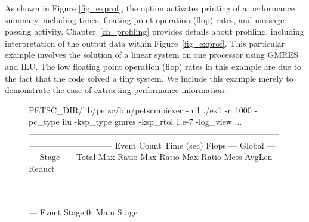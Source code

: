 As shown in Figure \ref{fig_exprof}, the option  activates printing of a performance summary, including
times, floating point operation (flop) rates, and message-passing
activity.  Chapter~\ref{ch_profiling}
provides details about profiling, including interpretation of the
output data within Figure~\ref{fig_exprof}.  This particular example involves the solution of a linear
system on one processor using GMRES and ILU.  The low floating point
operation (flop) rates in this example are due to the fact that the
code solved a tiny system.  We include this example merely to
demonstrate the ease of extracting performance information.

\begin{figure}[H]
{
  \begin{outputlisting}[\fontsize{7.5pt}{8pt}\ttfamily]
$ $PETSC_DIR/lib/petsc/bin/petscmpiexec -n 1 ./ex1 -n 1000 -pc_type ilu -ksp_type gmres -ksp_rtol 1.e-7 -log_view
...
------------------------------------------------------------------------------------------------------------------------
Event                Count      Time (sec)     Flops                             --- Global ---  --- Stage ----  Total
                   Max Ratio  Max     Ratio   Max  Ratio  Mess   AvgLen  Reduct  %
------------------------------------------------------------------------------------------------------------------------

--- Event Stage 0: Main Stage


\end{outputlisting}}
\end{figure}
